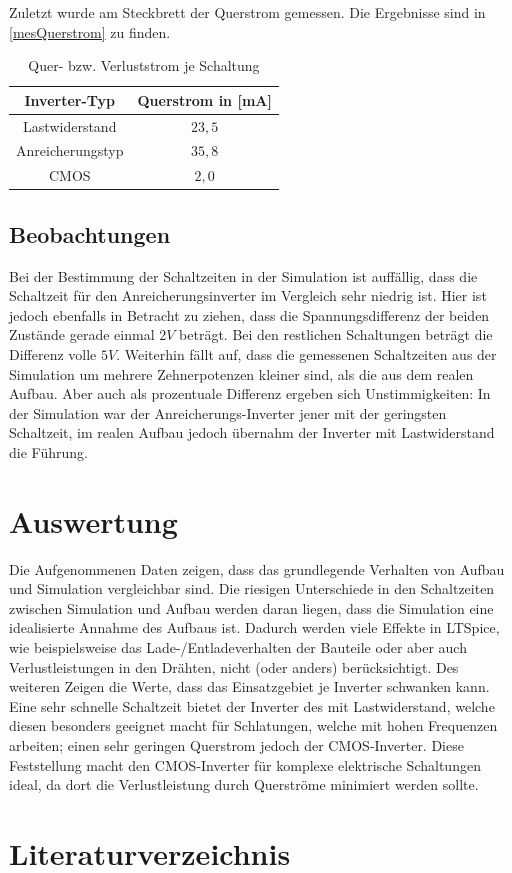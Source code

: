 \documentclass[11pt, a4paper]{article}
\begin{document}
Zuletzt wurde am Steckbrett der Querstrom gemessen. Die Ergebnisse sind in \autoref{mesQuerstrom} zu finden.
\begin{table}[h]
\centering
\begin{tabular}{c|c}
Inverter-Typ & Querstrom in [mA] \\ \hline
Lastwiderstand & $23,5$ \\
Anreicherungstyp & $35,8$ \\
CMOS & $2,0$
\end{tabular}
\caption{Quer- bzw. Verluststrom je Schaltung}
\label{mesQuerstrom}
\end{table}
\subsection*{Beobachtungen}
Bei der Bestimmung der Schaltzeiten in der Simulation ist auffällig, dass die Schaltzeit für den Anreicherungsinverter im Vergleich sehr niedrig ist. Hier ist jedoch ebenfalls in Betracht zu ziehen, dass die Spannungsdifferenz der beiden Zustände gerade einmal $2 V$ beträgt. Bei den restlichen Schaltungen beträgt die Differenz volle $5V$.
Weiterhin fällt auf, dass die gemessenen Schaltzeiten aus der Simulation um mehrere Zehnerpotenzen kleiner sind, als die aus dem realen Aufbau. Aber auch als prozentuale Differenz ergeben sich Unstimmigkeiten: In der Simulation war der Anreicherungs-Inverter jener mit der geringsten Schaltzeit, im realen Aufbau jedoch übernahm der Inverter mit Lastwiderstand die Führung.
\section*{Auswertung}
Die Aufgenommenen Daten zeigen, dass das grundlegende Verhalten von Aufbau und Simulation vergleichbar sind. Die riesigen Unterschiede in den Schaltzeiten zwischen Simulation und Aufbau werden daran liegen, dass die Simulation eine idealisierte Annahme des Aufbaus ist. Dadurch werden viele Effekte in LTSpice, wie beispielsweise das Lade-/Entladeverhalten der Bauteile oder aber auch Verlustleistungen in den Drähten, nicht (oder anders) berücksichtigt. Des weiteren Zeigen die Werte, dass das Einsatzgebiet je Inverter schwanken kann. Eine sehr schnelle Schaltzeit bietet der Inverter des mit Lastwiderstand, welche diesen besonders geeignet macht für Schlatungen, welche mit hohen Frequenzen arbeiten; einen sehr geringen Querstrom jedoch der CMOS-Inverter. Diese Feststellung macht den CMOS-Inverter für komplexe elektrische Schaltungen ideal, da dort die Verlustleistung durch Querströme minimiert werden sollte.


\section*{Literaturverzeichnis}
\end{document}
